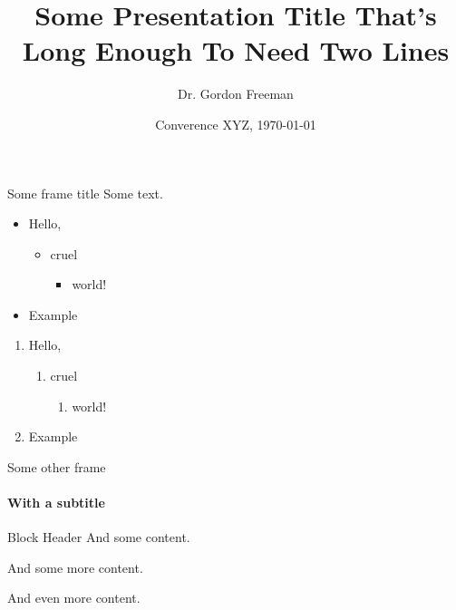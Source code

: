 \documentclass[t]{beamer}
\title{Some Presentation Title That's Long Enough To Need Two Lines}
\date[\today]{Converence XYZ, \today}
\author[Freeman]{Dr. Gordon Freeman}
\begin{document}
\begin{frame}
\titlepage
\end{frame}

\begin{frame}{Some frame title}
Some text.
\begin{itemize}
  \item Hello,
    \begin{itemize}
      \item cruel
        \begin{itemize}
          \item world!
        \end{itemize}
    \end{itemize}
    \item Example
\end{itemize}

\begin{enumerate}
  \item Hello,
    \begin{enumerate}
      \item cruel
        \begin{enumerate}
          \item world!
        \end{enumerate}
    \end{enumerate}
  \item Example
\end{enumerate}

\end{frame}


\begin{frame}{Some other frame}
\framesubtitle{With a subtitle}
\begin{block}{Block Header}
And some content.

And some more content.

And even more content.
\end{block}
\end{frame}
\end{document}
